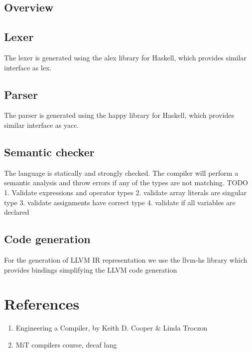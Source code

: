 \documentclass{article}
\begin{document}
\subsection{Overview}

\subsection{Lexer}
The lexer is generated using the alex library for Haskell, which provides similar interface as lex. 

\subsection{Parser}
The parser is generated using the happy library for Haskell, which provides similar interface as yacc. 


\subsection{Semantic checker}
The language is statically and strongly checked. The compiler will perform a semantic analysis and throw errors if any of the types are not matching. 
TODO
1. Validate expressions and operator types
2. validate array literals are singular type
3. validate assignments have correct type
4. validate if all variables are declared



\subsection{Code generation}
For the generation of LLVM IR representation we use the llvm-hs library which provides bindings simplifying the LLVM code generation





\section{References}
\begin{enumerate}
    \item  Engineering a Compiler, by Keith D. Cooper & Linda Troczon
    \item MiT compilers course, decaf lang
\end{enumerate}
\end{document}
